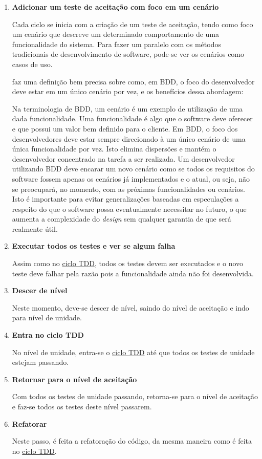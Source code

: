 \begin{enumerate}
\item \textbf{Adicionar um teste de aceitação com foco em um cenário}

Cada ciclo se inicia com a criação de um teste de aceitação, tendo como foco um cenário que descreve um determinado comportamento de uma funcionalidade do sistema. Para fazer um paralelo com os métodos tradicionais de desenvolvimento de software, pode-se ver os cenários como casos de uso.

 faz uma definição bem precisa sobre como, em BDD, o foco do desenvolvedor deve estar em um único cenário por vez, e os benefícios dessa abordagem:

\begin{citacao}
Na terminologia de BDD, um cenário é um exemplo de utilização de uma dada funcionalidade. Uma funcionalidade é algo que o software deve oferecer e que possui um valor bem definido para o cliente. Em BDD, o foco dos desenvolvedores deve estar sempre direcionado à um único cenário de uma única funcionalidade por vez. Isto elimina dispersões e mantém o desenvolvedor concentrado na tarefa a ser realizada. Um desenvolvedor utilizando BDD deve encarar um novo cenário como se todos os requisitos do software fossem apenas os cenários já implementados e o atual, ou seja, não se preocupará, no momento, com as próximas funcionalidades ou cenários. Isto é importante para evitar generalizações baseadas em especulações a respeito do que o software possa eventualmente necessitar no futuro, o que aumenta a complexidade do \textit{design} sem qualquer garantia de que será realmente útil.
\end{citacao}

\item \textbf{Executar todos os testes e ver se algum falha}

Assim como no \hyperref[ssub:ciclo_tdd]{ciclo TDD}, todos os testes devem ser executados e o novo teste deve falhar pela razão pois a funcionalidade ainda não foi desenvolvida.

\item \textbf{Descer de nível}

Neste momento, deve-se descer de nível, saindo do nível de aceitação e indo para nível de unidade.

\item \textbf{Entra no ciclo TDD}

No nível de unidade, entra-se o \hyperref[ssub:ciclo_tdd]{ciclo TDD} até que todos os testes de unidade estejam passando.

\item \textbf{Retornar para o nível de aceitação}

Com todos os testes de unidade passando, retorna-se para o nível de aceitação e faz-se todos os testes deste nível passarem.

\item \textbf{Refatorar}

Neste passo, é feita a refatoração do código, da mesma maneira como é feita no \hyperref[ssub:ciclo_tdd]{ciclo TDD}.

\end{enumerate}

